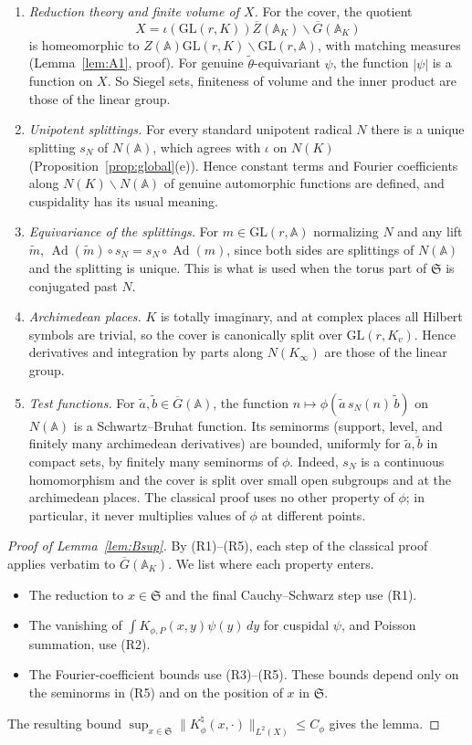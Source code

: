 \documentclass[12pt]{article}
\newcommand{\ov}[1]{\overline{#1}}
\newcommand{\A}{\mathbb{A}}
\newcommand{\Ad}{\operatorname{Ad}}
\newcommand{\GL}{\mathrm{GL}}
\newcommand{\Gb}{\ov{G}}
\newcommand{\Zb}{\ov{Z}}
\theoremstyle{plain}
\theoremstyle{definition}
\begin{document}
\begin{enumerate}[label=(R\arabic*),leftmargin=3em]
\item \emph{Reduction theory and finite volume of $X$.} For the cover, the quotient \[ X=\iota(\GL(r,K))\Zb(\A_K)\backslash\Gb(\A_K) \] is homeomorphic to $Z(\A)\GL(r,K)\backslash\GL(r,\A)$, with matching measures (Lemma~\ref{lem:A1}, proof). For genuine $\tilde\theta$-equivariant $\psi$, the function $|\psi|$ is a function on $X$. So Siegel sets, finiteness of volume and the inner product are those of the linear group.
\item \emph{Unipotent splittings.} For every standard unipotent radical $N$ there is a unique splitting $s_N$ of $N(\A)$, which agrees with $\iota$ on $N(K)$ (Proposition~\ref{prop:global}(e)). Hence constant terms and Fourier coefficients along $N(K)\backslash N(\A)$ of genuine automorphic functions are defined, and cuspidality has its usual meaning.
\item \emph{Equivariance of the splittings.} For $m\in\GL(r,\A)$ normalizing $N$ and any lift $\tilde m$, $\Ad(\tilde m)\circ s_N=s_N\circ\Ad(m)$, since both sides are splittings of $N(\A)$ and the splitting is unique. This is what is used when the torus part of $\mathfrak S$ is conjugated past $N$.
\item \emph{Archimedean places.} $K$ is totally imaginary, and at complex places all Hilbert symbols are trivial, so the cover is canonically split over $\GL(r,K_v)$. Hence derivatives and integration by parts along $N(K_\infty)$ are those of the linear group.
\item \emph{Test functions.} For $\tilde a,\tilde b\in\Gb(\A)$, the function $n\mapsto\phi(\tilde a\,s_N(n)\,\tilde b)$ on $N(\A)$ is a Schwartz--Bruhat function. Its seminorms (support, level, and finitely many archimedean derivatives) are bounded, uniformly for $\tilde a,\tilde b$ in compact sets, by finitely many seminorms of $\phi$. Indeed, $s_N$ is a continuous homomorphism and the cover is split over small open subgroups and at the archimedean places. The classical proof uses no other property of $\phi$; in particular, it never multiplies values of $\phi$ at different points.
\end{enumerate}

\begin{proof}[Proof of Lemma~\ref{lem:Bsup}]
By (R1)--(R5), each step of the classical proof applies verbatim to $\Gb(\A_K)$. We list where each property enters.
\begin{itemize}
\item The reduction to $x\in\mathfrak S$ and the final Cauchy--Schwarz step use (R1).
\item The vanishing of $\int K_{\phi,P}(x,y)\psi(y)\,dy$ for cuspidal $\psi$, and Poisson summation, use (R2).
\item The Fourier-coefficient bounds use (R3)--(R5). These bounds depend only on the seminorms in (R5) and on the position of $x$ in $\mathfrak S$.
\end{itemize}
The resulting bound $\sup_{x\in\mathfrak S}\|K_\phi^\natural(x,\cdot)\|_{L^2(X)}\le C_\phi$ gives the lemma.
\end{proof}
\end{document}
